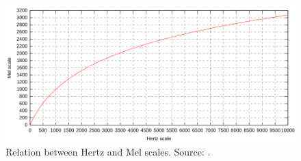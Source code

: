 \documentclass{beamer}
\begin{document}
\begin{frame}[allowframebreaks]
	\begin{figure}[!ht]
		\centering
		\includegraphics[width=.9\textwidth]{Mel-Hz_plot.png}
		\caption{Relation between Hertz and Mel scales. Source: \cite{MEL}.}
		\label{fig:mel}
	\end{figure}




\end{frame}
\end{document}
